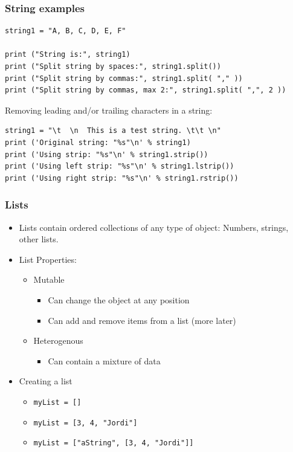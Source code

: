 \documentclass{beamer}
\begin{document}
\begin{frame}[containsverbatim]
\frametitle{String examples}
\begin{lstlisting}
string1 = "A, B, C, D, E, F"

print ("String is:", string1)
print ("Split string by spaces:", string1.split())
print ("Split string by commas:", string1.split( "," ))
print ("Split string by commas, max 2:", string1.split( ",", 2 ))
\end{lstlisting}
Removing leading and/or trailing characters in a string:
\begin{lstlisting}
string1 = "\t  \n  This is a test string. \t\t \n"
print ('Original string: "%s"\n' % string1)
print ('Using strip: "%s"\n' % string1.strip())
print ('Using left strip: "%s"\n' % string1.lstrip())
print ('Using right strip: "%s"\n' % string1.rstrip())
\end{lstlisting}
\end{frame}


\begin{frame}
\frametitle{Lists}
\begin{itemize}
\item Lists contain ordered collections of any type of object: Numbers, strings, other lists.
\item List Properties:
\begin{itemize}
\item Mutable
\begin{itemize}
\item Can change the object at any position
\item Can add and remove items from a list (more later)
\end{itemize}
\item  Heterogenous
\begin{itemize}
\item Can contain a mixture of data
\end{itemize}
\end{itemize}
\item Creating a list
\begin{itemize}
\item \texttt{myList = []} 
\item \texttt{myList = [3, 4, "Jordi"]}
\item \texttt{myList = ["aString", [3, 4, "Jordi"]]}
\end{itemize}
\end{itemize}
\end{frame}
\end{document}
